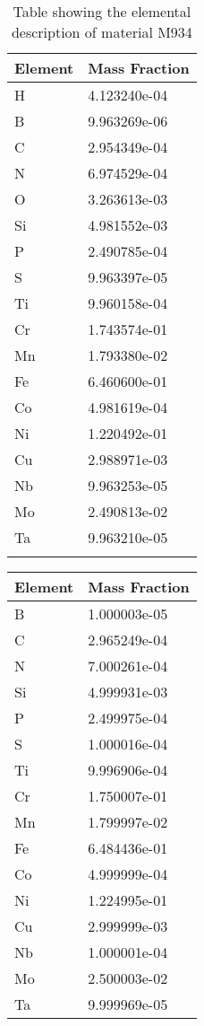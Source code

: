 \begin{centering}
\clearpage
\begin{longtable}[ht!]
{ p{} | p{} }
\hline
Element & Mass Fraction\\
\hline
H &  4.123240e-04\\
B &  9.963269e-06\\
C &  2.954349e-04\\
N &  6.974529e-04\\
O &  3.263613e-03\\
Si &  4.981552e-03\\
P &  2.490785e-04\\
S &  9.963397e-05\\
Ti &  9.960158e-04\\
Cr &  1.743574e-01\\
Mn &  1.793380e-02\\
Fe &  6.460600e-01\\
Co &  4.981619e-04\\
Ni &  1.220492e-01\\
Cu &  2.988971e-03\\
Nb &  9.963253e-05\\
Mo &  2.490813e-02\\
Ta &  9.963210e-05\\
\caption{Table showing the elemental description of material M934}
\label{table:material_UPDSM}
\end{longtable}
\clearpage
\begin{longtable}[ht!]
{ p{} | p{} }
\hline
Element & Mass Fraction\\
\hline
B &  1.000003e-05\\
C &  2.965249e-04\\
N &  7.000261e-04\\
Si &  4.999931e-03\\
P &  2.499975e-04\\
S &  1.000016e-04\\
Ti &  9.996906e-04\\
Cr &  1.750007e-01\\
Mn &  1.799997e-02\\
Fe &  6.484436e-01\\
Co &  4.999999e-04\\
Ni &  1.224995e-01\\
Cu &  2.999999e-03\\
Nb &  1.000001e-04\\
Mo &  2.500003e-02\\
Ta &  9.999969e-05\\

\end{longtable}
\end{centering}
